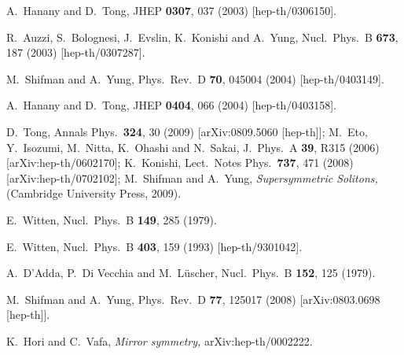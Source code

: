 \documentclass[epsfig,12pt]{article}
\begin{document}
{\begin{thebibliography}{99}
A.~Hanany and D.~Tong,
JHEP {\bf 0307}, 037 (2003)
[hep-th/0306150].

R.~Auzzi, S.~Bolognesi, J.~Evslin, K.~Konishi and A.~Yung,
Nucl.\ Phys.\ B {\bf 673}, 187 (2003)
[hep-th/0307287].

M.~Shifman and A.~Yung,
Phys.\ Rev.\ D {\bf 70}, 045004 (2004)
[hep-th/0403149].

A.~Hanany and D.~Tong,
JHEP {\bf 0404}, 066 (2004)
[hep-th/0403158].

D.~Tong,
  Annals Phys.\  {\bf 324}, 30 (2009)
  [arXiv:0809.5060 [hep-th]];
  M.~Eto, Y.~Isozumi, M.~Nitta, K.~Ohashi and N.~Sakai,
  J.\ Phys.\ A  {\bf 39}, R315 (2006)
  [arXiv:hep-th/0602170];
  K.~Konishi,
  Lect.\ Notes Phys.\  {\bf 737}, 471 (2008)
  [arXiv:hep-th/0702102];
M.~Shifman and A.~Yung,
{\sl Supersymmetric Solitons,}
(Cambridge University Press, 2009).

E.~Witten,
Nucl.\ Phys.\ B {\bf 149}, 285 (1979).

E.~Witten,
  Nucl.\ Phys.\ B {\bf 403}, 159 (1993)
  [hep-th/9301042].
  
  A.~D'Adda, P.~Di Vecchia and M.~L\"{u}scher,
  Nucl.\ Phys.\  B {\bf 152}, 125 (1979).
  
  M.~Shifman and A.~Yung,
  Phys.\ Rev.\  D {\bf 77}, 125017 (2008)
  [arXiv:0803.0698 [hep-th]].
  
  K.~Hori and C.~Vafa,
{\em Mirror symmetry,}
  arXiv:hep-th/0002222.
  

\end{thebibliography}}
\end{document}
